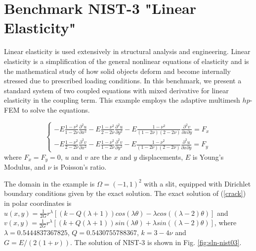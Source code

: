 \documentclass[12pt]{elsarticle}
\begin{document}

\section{Benchmark NIST-3 "Linear Elasticity"}
\label{sec:bench-3}

Linear elasticity is used extensively in structural analysis
and engineering. Linear elasticity is a simplification
of the general nonlinear equations of elasticity and is the mathematical
study of how solid objects deform and become internally
stressed due to prescribed loading conditions.
In this benchmark, we present a standard system of two
coupled equations with mixed derivative for linear elasticity
in the coupling term. This example employs the adaptive multimesh $hp$-FEM
to solve the equations.

\begin{equation}\label{crack}
\left\{
\begin{array}{l}
\displaystyle
-E \frac{1-\nu^2}{1-2\nu} \frac{\partial^{2} u}{\partial x^{2}} - E\frac{1-\nu^2}{2-2 \nu} \frac{\partial^{2} u}{\partial y^{2}}
-E \frac{1-\nu^2}{(1-2\nu)(2-2\nu)} \frac{\partial^{2} v}{\partial x \partial y} = F_{x} \\
\displaystyle
-E \frac{1-\nu^2}{2-2\nu} \frac{\partial^{2} v}{\partial x^{2}} - E\frac{1-\nu^2}{1-2\nu} \frac{\partial^{2} v}{\partial y^{2}}
-E \frac{1-\nu^2}{(1-2\nu)(2-2\nu)} \frac{\partial^{2} u}{\partial x \partial y} = F_{y}
\end{array}
\right.
\end{equation}
where $F_{x} = F_{y} = 0$, $u$ and $v$ are the
$x$ and $y$ displacements, $E$ is Young's Modulus,
and $\nu$ is Poisson's ratio.

The domain in the example is $\Omega = (-1, 1)^2$ with a slit,
equipped with Dirichlet boundary conditions given by the
exact solution. The exact solution of (\ref{crack}) in polar coordinates is
$u(x, y) = \frac{1}{2G} r^{\lambda}[(k - Q(\lambda + 1))cos(\lambda \theta) - \lambda cos((\lambda - 2) \theta)]$ and
$v(x, y) = \frac{1}{2G} r^{\lambda}[(k + Q(\lambda + 1))sin(\lambda \theta) + \lambda sin((\lambda - 2) \theta)]$,
where $\lambda = 0.5444837367825$, $Q = 0.5430755788367$,
$k = 3 - 4 \nu$ and $G = E / (2(1 + \nu))$.
The solution of NIST-3 is shown in Fig. \ref{fig:sln-nist03}.
\end{document}
